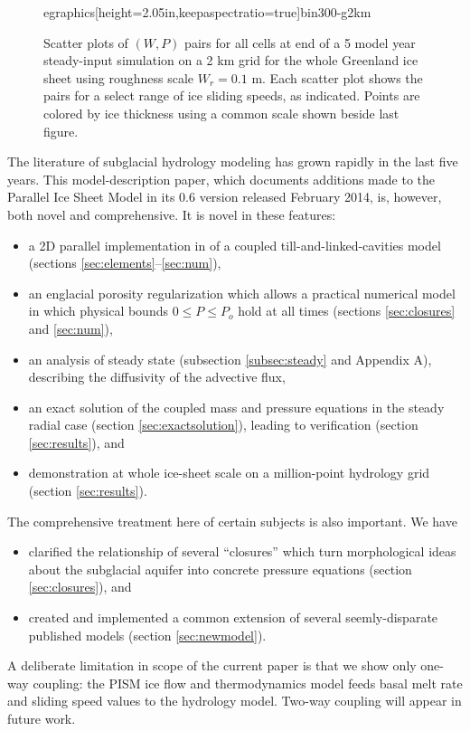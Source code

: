 \documentclass[gmd]{copernicus}   %
\begin{document}
\begin{figure}[ht]
{egraphics[height=2.05in,keepaspectratio=true]{bin300-g2km}}
\caption{Scatter plots of $(W,P)$ pairs for all cells at end of a 5 model year steady-input simulation on a 2 km grid for the whole Greenland ice sheet using roughness scale $W_r = 0.1$ m.  Each scatter plot shows the pairs for a select range of ice sliding speeds, as indicated.  Points are colored by ice thickness using a common scale shown beside last figure.}
\label{fig:GreenisPofW}
\end{figure}


\conclusions  \label{sec:conclusion}  The literature of subglacial hydrology modeling has grown rapidly in the last five years.  This model-description paper, which documents additions made to the Parallel Ice Sheet Model in its 0.6 version released February 2014, is, however, both novel and comprehensive.  It is novel in these features:\begin{itemize}
\item a 2D parallel implementation in of a coupled till-and-linked-cavities model (sections \ref{sec:elements}--\ref{sec:num}),
\item an englacial porosity regularization which allows a practical numerical model in which physical bounds $0\le P \le P_o$ hold at all times (sections \ref{sec:closures} and \ref{sec:num}),
\item an analysis of steady state (subsection \ref{subsec:steady} and Appendix A), describing the diffusivity of the advective flux,
\item an exact solution of the coupled mass and pressure equations in the steady radial case (section \ref{sec:exactsolution}), leading to verification (section \ref{sec:results}), and
\item demonstration at whole ice-sheet scale on a million-point hydrology grid (section \ref{sec:results}).
\end{itemize}
The comprehensive treatment here of certain subjects is also important.  We have
\begin{itemize}
\item clarified the relationship of several ``closures'' which turn morphological ideas about the subglacial aquifer into concrete pressure equations (section \ref{sec:closures}), and
\item created and implemented a common extension of several seemly-disparate published models (section \ref{sec:newmodel}).
\end{itemize}
A deliberate limitation in scope of the current paper is that we show only one-way coupling: the PISM ice flow and thermodynamics model feeds basal melt rate and sliding speed values to the hydrology model.  Two-way coupling  will appear in future work.
\end{document}
